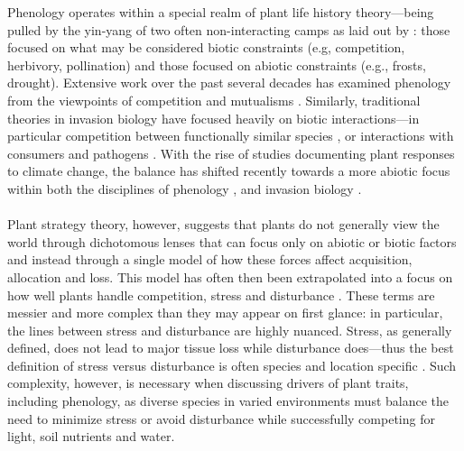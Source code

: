 \documentclass[11pt,a4paper,oneside]{article}
\begin{document}
Phenology operates within a special realm of plant life history theory---being pulled by the yin-yang of two often non-interacting camps as laid out by \cite{stanton2000}: those focused on what may be considered biotic constraints (e.g, competition, herbivory, pollination) and those focused on abiotic constraints (e.g., frosts, drought). Extensive work over the past several decades has examined phenology from the viewpoints of competition \citep[e.g.,][]{Rathcke:1988yc,VANSCHAIK:1993uq} and mutualisms \citep[e.g.,][]{Brody:1997ro}. Similarly, traditional theories in invasion biology have focused heavily on biotic interactions---in particular competition between functionally similar species \citep[limiting similarity and competitive exclusion,][]{macarthur1967,abrams1983}, or interactions with consumers and pathogens \citep[enemy release,][]{Keane:2002uz,Liu:2006kj}. With the rise of studies documenting plant responses to climate change, the balance has shifted recently towards a more abiotic focus within both the disciplines of phenology \citep[e.g.,][]{Inouye:2008gj,Miller-Rushing:2008zv}, and invasion biology \citep{sorte2013}.\\
\\
Plant strategy theory, however, suggests that plants do not generally view the world through dichotomous lenses that can focus only on abiotic or biotic factors and instead through a single model of how these forces affect acquisition, allocation and loss. This model has often then been extrapolated into a focus on how well plants handle competition, stress and disturbance \citep{Grime:1977sw,crainebook}. These terms are messier and more complex than they may appear on first glance: in particular, the lines between stress and disturbance are highly nuanced. Stress, as generally defined, does not lead to major tissue loss while disturbance does---thus the best definition of stress versus disturbance is often species and location specific \citep{crainebook}. Such complexity, however, is necessary when discussing drivers of plant traits, including phenology, as diverse species in varied environments must balance the need to minimize stress or avoid disturbance while successfully competing for light, soil nutrients and water.\\ %
\end{document}
